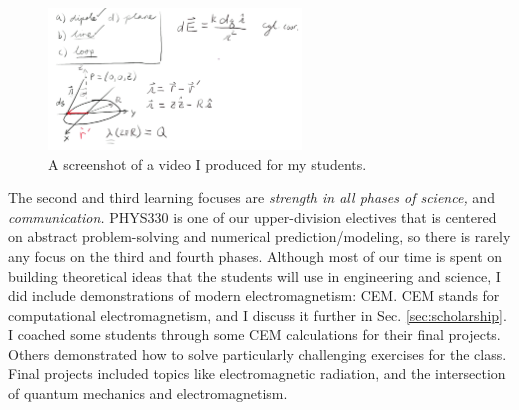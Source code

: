 \documentclass[../../../main.tex]{subfiles}
\begin{document}
\\
\vspace{0.15cm}
\begin{figure}
\centering
\includegraphics[width=0.6\textwidth]{figures/video_330.png}
\caption{\label{fig:video} A screenshot of a video I produced for my students.}
\end{figure}

The second and third learning focuses are \textit{strength in all phases of science,} and \textit{communication.}  PHYS330 is one of our upper-division electives that is centered on abstract problem-solving and numerical prediction/modeling, so there is rarely any focus on the third and fourth phases.  Although most of our time is spent on building theoretical ideas that the students will use in engineering and science, I did include demonstrations of modern electromagnetism: CEM.  CEM stands for computational electromagnetism, and I discuss it further in Sec. \ref{sec:scholarship}.  I coached some students through some CEM calculations for their final projects.  Others demonstrated how to solve particularly challenging exercises for the class.  Final projects included topics like electromagnetic radiation, and the intersection of quantum mechanics and electromagnetism.
\end{document}

